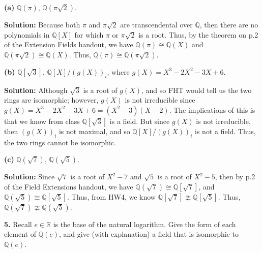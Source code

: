 \documentclass[12pt, a4paper]{article}
\begin{document}
\textbf{(a)} $\mathbb{Q}(\pi)$, $\mathbb{Q}(\pi\sqrt{2})$.

\vspace{4mm}\par

\textbf{Solution:} Because both $\pi$ and $\pi\sqrt{2}$ are transcendental over $\mathbb{Q}$, then there are no polynomials in $\mathbb{Q}[X]$ for which $\pi$ or $\pi\sqrt{2}$ is a root. Thus, by the theorem on p.2 of the Extension Fields handout, we have $\mathbb{Q}(\pi)\cong\mathbb{Q}(X)$ and $\mathbb{Q}(\pi\sqrt{2})\cong\mathbb{Q}(X)$. Thus, $\mathbb{Q}(\pi)\cong\mathbb{Q}(\pi\sqrt{2})$.

\vspace{4mm}\par

\textbf{(b)} $\mathbb{Q}[\sqrt{3}]$, $\mathbb{Q}[X]/(g(X))_i$, where $g(X)=X^3-2X^2-3X+6$.

\vspace{4mm}\par

\textbf{Solution:} Although $\sqrt{3}$ is a root of $g(X)$, and so FHT would tell us the two rings are isomorphic; however, $g(X)$ is not irreducible since $g(X)=X^3-2X^2-3X+6=(X^2-3)(X-2)$. The implications of this is that we know from class $\mathbb{Q}[\sqrt{3}]$ is a field. But since $g(X)$ is not irreducible, then $(g(X))_i$ is not maximal, and so $\mathbb{Q}[X]/(g(X))_i$ is not a field. Thus, the two rings cannot be isomorphic.

\vspace{4mm}\par

\textbf{(c)} $\mathbb{Q}(\sqrt{7})$, $\mathbb{Q}(\sqrt{5})$.

\vspace{4mm}\par

\textbf{Solution:} Since $\sqrt{7}$ is a root of $X^2-7$ and $\sqrt{5}$ is a root of $X^2-5$, then by p.2 of the Field Extensions handout, we have $\mathbb{Q}(\sqrt{7})\cong\mathbb{Q}[\sqrt{7}]$, and $\mathbb{Q}(\sqrt{5})\cong\mathbb{Q}[\sqrt{5}]$. Thus, from HW4, we know $\mathbb{Q}[\sqrt{7}]\ncong\mathbb{Q}[\sqrt{5}]$. Thus, $\mathbb{Q}(\sqrt{7})\ncong\mathbb{Q}(\sqrt{5})$.

\vspace{4mm}

\noindent\textbf{5.} Recall $e\in\mathbb{R}$ is the base of the natural logarithm. Give the form of each element of $\mathbb{Q}(e)$, and give (with explanation) a field that is isomorphic to $\mathbb{Q}(e)$.
\end{document}

